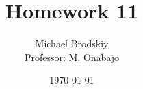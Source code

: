


\title{Homework 11}
\date{\today}
\author{Michael Brodskiy\\ \small Professor: M. Onabajo}



\maketitle


